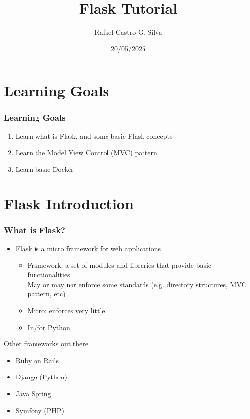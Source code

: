 \documentclass[fleqn,aspectratio=169,10pt]{beamer}
\title[Flask Tutorial]{Flask Tutorial}
\author[Rafael]{Rafael Castro G. Silva}
\date{20/05/2025}
\institute[UCPH]{
  Department of Computer Science \\
  University of Copenhagen}
\begin{document}

\begin{frame}
  \titlepage
\end{frame}

\section{Learning Goals}

\begin{frame}
  \frametitle{Learning Goals}
  \begin{enumerate}
    \item Learn what is Flask, and some basic Flask concepts
    \item Learn the Model View Control (MVC) pattern
    \item Learn basic Docker
  \end{enumerate}
\end{frame}

\section{Flask Introduction}

\begin{frame}[fragile]
  \frametitle{What is Flask?}
  \begin{itemize}
          \pause
    \item Flask is a micro framework for web applications
          \pause
          \begin{itemize}
            \item Framework: a set of modules and libraries that provide basic functionalities \\
                  May or may nor enforce some standards (e.g. directory structures, MVC pattern, etc)
            \item Micro: enforces very little
            \item In/for Python
          \end{itemize}
  \end{itemize}
  \pause
  \begin{block}{Other frameworks out there}
    \begin{itemize}
      \item Ruby on Rails
      \item Django (Python)
      \item Java Spring
      \item Symfony (PHP)
    \end{itemize}
  \end{block}
\end{frame}
\end{document}
